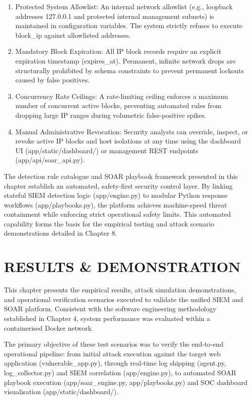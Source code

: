\begin{enumerate}
  \item Protected System Allowlist: An internal network allowlist (e.g., loopback addresses 127.0.0.1 and protected internal management subnets) is maintained in configuration variables. The system strictly refuses to execute block\_ip against allowlisted addresses.
  \item Mandatory Block Expiration: All IP block records require an explicit expiration timestamp (expires\_at). Permanent, infinite network drops are structurally prohibited by schema constraints to prevent permanent lockouts caused by false positives.
  \item Concurrency Rate Ceilings: A rate-limiting ceiling enforces a maximum number of concurrent active blocks, preventing automated rules from dropping large IP ranges during volumetric false-positive spikes.
  \item Manual Administrative Revocation: Security analysts can override, inspect, or revoke active IP blocks and host isolations at any time using the dashboard UI (app/static/dashboard/) or management REST endpoints (app/api/soar\_api.py).
\end{enumerate}

The detection rule catalogue and SOAR playbook framework presented in this chapter establish an automated, safety-first security control layer. By linking stateful SIEM detection logic (app/engine.py) to modular Python response workflows (app/playbooks.py), the platform achieves machine-speed threat containment while enforcing strict operational safety limits. This automated capability forms the basis for the empirical testing and attack scenario demonstrations detailed in Chapter 8.

\newpage
\chapter{RESULTS \& DEMONSTRATION}

This chapter presents the empirical results, attack simulation demonstrations, and operational verification scenarios executed to validate the unified SIEM and SOAR platform. Consistent with the software engineering methodology established in Chapter 4, system performance was evaluated within a containerised Docker network.

The primary objective of these test scenarios was to verify the end-to-end operational pipeline: from initial attack execution against the target web application (vulnerable\_app.py), through real-time log shipping (agent.py, log\_collector.py) and SIEM correlation (app/engine.py), to automated SOAR playbook execution (app/soar\_engine.py, app/playbooks.py) and SOC dashboard visualisation (app/static/dashboard/).

